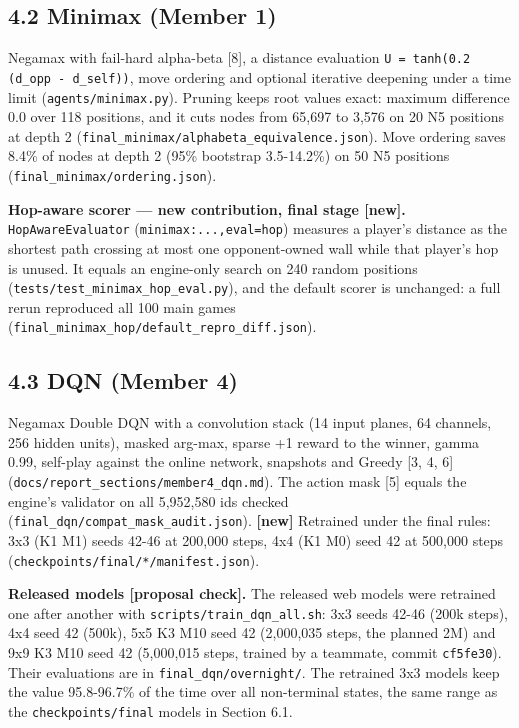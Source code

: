 \documentclass[11pt]{article}
\begin{document}
\subsection{4.2 Minimax (Member 1)}

Negamax with fail-hard alpha-beta [8], a distance evaluation \texttt{U = tanh(0.2 (d\_opp - d\_self))},
move ordering and optional iterative deepening under a time limit (\texttt{agents/minimax.py}).
Pruning keeps root values exact: maximum difference 0.0 over 118 positions, and it cuts nodes
from 65,697 to 3,576 on 20 N5 positions at depth 2 (\texttt{final\_minimax/alphabeta\_equivalence.json}).
Move ordering saves 8.4\% of nodes at depth 2 (95\% bootstrap 3.5-14.2\%) on 50 N5 positions
(\texttt{final\_minimax/ordering.json}).

\textbf{Hop-aware scorer — new contribution, final stage [new].} \texttt{HopAwareEvaluator}
(\texttt{minimax:...,eval=hop}) measures a player's distance as the shortest path crossing at most one
opponent-owned wall while that player's hop is unused. It equals an engine-only search on 240
random positions (\texttt{tests/test\_minimax\_hop\_eval.py}), and the default scorer is unchanged: a full
rerun reproduced all 100 main games (\texttt{final\_minimax\_hop/default\_repro\_diff.json}).

\subsection{4.3 DQN (Member 4)}

Negamax Double DQN with a convolution stack (14 input planes, 64 channels, 256 hidden units),
masked arg-max, sparse +1 reward to the winner, gamma 0.99, self-play against the online
network, snapshots and Greedy [3, 4, 6] (\texttt{docs/report\_sections/member4\_dqn.md}). The action mask [5] equals
the engine's validator on all 5,952,580 ids checked (\texttt{final\_dqn/compat\_mask\_audit.json}).
\textbf{[new]} Retrained under the final rules: 3x3 (K1 M1) seeds 42-46 at 200,000 steps, 4x4 (K1 M0)
seed 42 at 500,000 steps (\texttt{checkpoints/final/*/manifest.json}).

\textbf{Released models [proposal check].} The released web models were retrained one after
another with \texttt{scripts/train\_dqn\_all.sh}: 3x3 seeds 42-46 (200k steps), 4x4 seed 42 (500k),
5x5 K3 M10 seed 42 (2,000,035 steps, the planned 2M) and 9x9 K3 M10 seed 42 (5,000,015 steps,
trained by a teammate, commit \texttt{cf5fe30}). Their evaluations are in \texttt{final\_dqn/overnight/}. The
retrained 3x3 models keep the value 95.8-96.7\% of the time over all non-terminal states, the
same range as the \texttt{checkpoints/final} models in Section 6.1.
\end{document}

